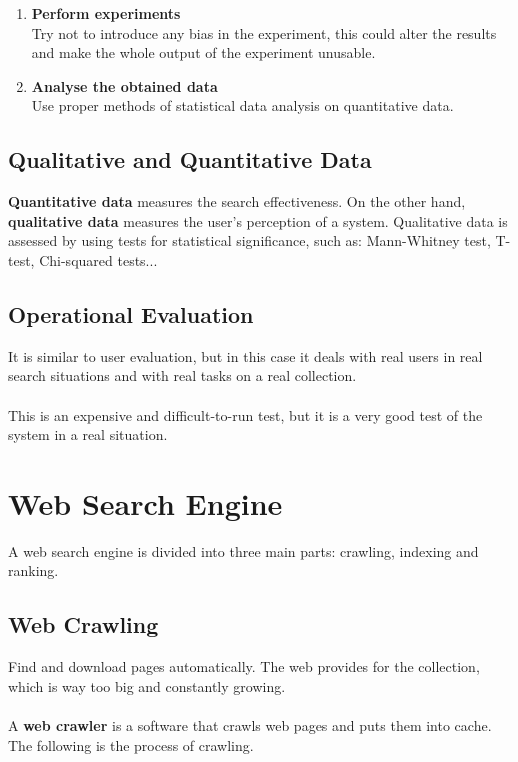 \documentclass{article}
\begin{document}
\begin{enumerate}
	\item \textbf{Perform experiments}
	\vspace{.2cm} \\
	Try not to introduce any bias in the experiment, this could alter the results and make the whole output of the experiment unusable.
		
	\item \textbf{Analyse the obtained data}
	\vspace{.2cm} \\
	Use proper methods of statistical data analysis on quantitative data.
\end{enumerate}

\subsection{Qualitative and Quantitative Data}
\textbf{Quantitative data} measures the search effectiveness. On the other hand, \textbf{qualitative data} measures the user's perception of a system. Qualitative data is assessed by using tests for statistical significance, such as: Mann-Whitney test, T-test, Chi-squared tests...

\subsection{Operational Evaluation}
It is similar to user evaluation, but in this case it deals with real users in real search situations and with real tasks on a real collection. \\ \\
This is an expensive and difficult-to-run test, but it is a very good test of the system in a real situation.

\section{Web Search Engine}
A web search engine is divided into three main parts: crawling, indexing and ranking.

\subsection{Web Crawling}
Find and download pages automatically. The web provides for the collection, which is way too big and constantly growing. \\ \\
A \textbf{web crawler} is a software that crawls web pages and puts them into cache. The following is the process of crawling.
\end{document}
